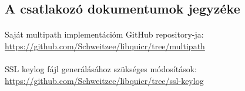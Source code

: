 \documentclass[a4paper,oneside]{article}
\begin{document}
\subsection{A csatlakozó dokumentumok jegyzéke}
\label{sec:csat-irod}
\paragraph{}
Saját multipath implementációm GitHub repository-ja: \url{https://github.com/Schweitzee/libquicr/tree/multipath}

\paragraph{}
SSL keylog fájl generálásához szükséges módosítások: \url{https://github.com/Schweitzee/libquicr/tree/ssl-keylog}
\end{document}
